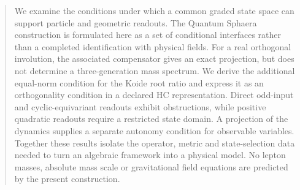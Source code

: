 
\maketitle
\begin{abstract}
We examine the conditions under which a common graded state space can
support particle and geometric readouts. The Quantum Sphaera construction
is formulated here as a set of conditional interfaces rather than a
completed identification with physical fields. For a real orthogonal
involution, the associated compensator gives an exact projection, but
does not determine a three-generation mass spectrum. We derive the
additional equal-norm condition for the Koide root ratio and express it
as an orthogonality condition in a declared HC representation. Direct
odd-input and cyclic-equivariant readouts exhibit obstructions, while
positive quadratic readouts require a restricted state domain. A
projection of the dynamics supplies a separate autonomy condition for
observable variables. Together these results isolate the operator,
metric and state-selection data needed to turn an algebraic framework
into a physical model. No lepton masses, absolute mass scale or
gravitational field equations are predicted by the present construction.
\end{abstract}
